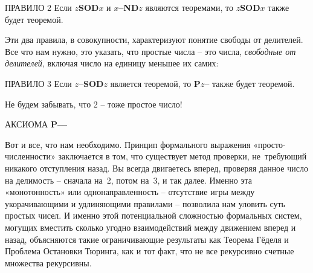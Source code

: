 \documentclass[../main.tex]{subfiles}
\begin{document}
\begin{mybox}{ПРАВИЛО 2}
    Если \textbf{$z$SOD$x$} и \textbf{$x$--ND$z$} являются теоремами, то \textbf{$z$SOD$x$} также будет теоремой.
\end{mybox}

Эти два правила, в совокупности, характеризуют понятие свободы от делителей. Все что нам нужно, это указать, что простые числа \--- это числа, \emph{свободные от делителей}, включая число на единицу меньшее их самих:

\begin{mybox}{ПРАВИЛО 3}
    Если \textbf{$z$--SOD$z$} является теоремой, то \textbf{P$z$--} также будет теоремой.
\end{mybox}

Не будем забывать, что 2 \--- тоже простое число!

\begin{mybox}{АКСИОМА}
    \textbf{P--{}--}
\end{mybox}

Вот и все, что нам необходимо. Принцип формального выражения «просто-численности» заключается в том, что существует метод проверки, не~требующий никакого отступления назад. Вы всегда двигаетесь вперед, проверяя данное число на делимость \--- сначала на~2, потом на~3, и так далее. Именно эта «монотонность» или однонаправленность \--- отсутствие игры между укорачивающими и удлиняющими правилами \--- позволила нам уловить суть простых чисел. И именно этой потенциальной сложностью формальных систем, могущих вместить сколько угодно взаимодействий между движением вперед и назад, объясняются такие ограничивающие результаты как Теорема Гёделя и Проблема Остановки Тюринга, как и тот факт, что не все рекурсивно счетные множества рекурсивны.
\end{document}
